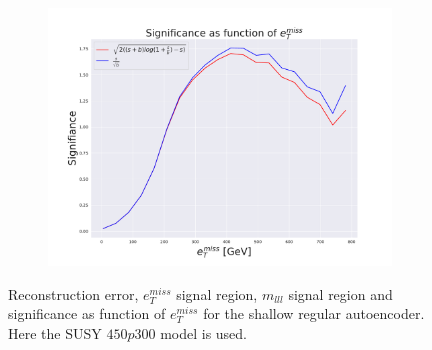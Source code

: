 \begin{figure}[H]
    \hfill  
    \begin{subfigure}{.60\textwidth}
        \includegraphics[width=\textwidth]{Figures/VAE_testing/small/2lep/significance_etmiss_450p0p0300_-0.8484803499636524.pdf}
        \caption{}
        \label{fig:VAE_2lep_small_signi_450}
    \end{subfigure}
    \hfill      
    \caption[2lep shallow network | $450p300$ | VAE]{Reconstruction error, $e_T^{miss}$ signal region, $m_{lll}$ signal region and significance as function of 
    $e_T^{miss}$ for the shallow regular autoencoder. Here the SUSY $450p300$ model is used.}
    \label{fig:VAE_2lep_small_rec_sig_signi_450}
\end{figure}










